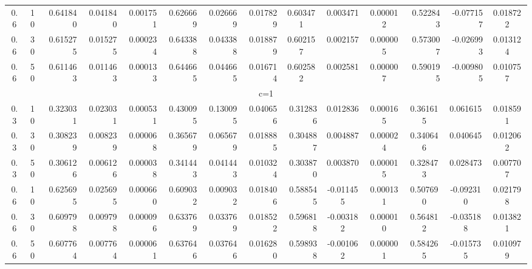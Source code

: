 \documentclass[11pt,a4paper]{article}
\numberwithin{equation}{section}
\begin{document}
\begin{landscape}
\begin{table}[htbp]
\begin{tabular}{cc|rrr|rrr|rcc|ccc}
				0.6   & 10    & 0.641840 & 0.041840 & 0.001751 & 0.626669 & 0.026669 & 0.017829 & \multicolumn{1}{c}{0.603471} & 0.003471 & 0.000012 & \multicolumn{1}{r}{0.522843} & \multicolumn{1}{r}{-0.077157} & 0.018722 \\

				0.6   & 30    & 0.615275 & 0.015275 & 0.000234 & 0.643388 & 0.043388 & 0.018879 & \multicolumn{1}{c}{0.602157} & 0.002157 & 0.000005 & \multicolumn{1}{r}{0.573007} & \multicolumn{1}{r}{-0.026993} & 0.013124 \\

				0.6   & 50    & 0.611463 & 0.011463 & 0.000133 & 0.644665 & 0.044665 & 0.016714 & \multicolumn{1}{c}{0.602582} & 0.002581 & 0.000007 & \multicolumn{1}{r}{0.590195} & \multicolumn{1}{r}{-0.009805} & 0.010757 \\

				\midrule

				\multicolumn{14}{c}{                                      c=1} \\

				\midrule

				0.3   & 10    & 0.323031 & 0.023031 & 0.000531 & 0.430095 & 0.130095 & 0.040656 & 0.312836 & 0.012836 & 0.000165 & 0.361615 & 0.061615 & 0.018591 \\

				0.3   & 30    & 0.308239 & 0.008239 & 0.000068 & 0.365679 & 0.065679 & 0.018885 & 0.304887 & 0.004887 & 0.000024 & 0.340646 & 0.040645 & 0.012062 \\

				0.3   & 50    & 0.306126 & 0.006126 & 0.000038 & 0.341443 & 0.041443 & 0.010324 & 0.303870 & 0.003870 & 0.000015 & 0.328473 & 0.028473 & 0.007707 \\

				0.6   & 10    & 0.625695 & 0.025695 & 0.000660 & 0.609032 & 0.009032 & 0.018406 & 0.588545 & -0.011455 & 0.000131 & 0.507690 & -0.092310 & 0.021798 \\

				0.6   & 30    & 0.609798 & 0.009798 & 0.000096 & 0.633769 & 0.033769 & 0.018522 & 0.596818 & -0.003182 & 0.000010 & 0.564812 & -0.035188 & 0.013821 \\

				0.6   & 50    & 0.607764 & 0.007764 & 0.000061 & 0.637646 & 0.037646 & 0.016280 & 0.598938 & -0.001062 & 0.000001 & 0.584265 & -0.015735 & 0.010979 \\

				\midrule


\end{tabular}
\end{table}
\end{landscape}
\end{document}
